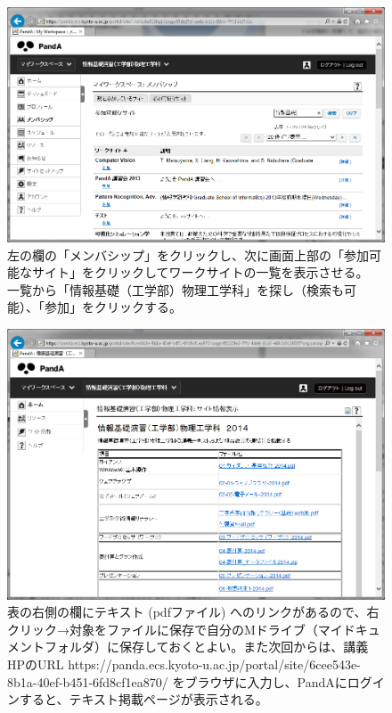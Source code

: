 \begin{figure}
\centering
\includegraphics[width=13cm]{TeX_files/figs1/PandA2.png}
\caption{
\label{fig:PandA2}
左の欄の「メンバシップ」をクリックし、次に画面上部の「参加可能なサイト」をクリックしてワークサイトの一覧を表示させる。
一覧から「情報基礎（工学部）物理工学科」を探し（検索も可能）、「参加」をクリックする。}
\end{figure}

\begin{figure}
\centering
\includegraphics[width=13cm]{TeX_files/figs1/PandA3.png}
\caption{
\label{fig:PandA3}
表の右側の欄にテキスト (pdfファイル) へのリンクがあるので、右クリック→対象をファイルに保存で自分のMドライブ（マイドキュメントフォルダ）に保存しておくとよい。また次回からは、講義HPのURL
https://panda.ecs.kyoto-u.ac.jp/portal/site/6cee543e-8b1a-40ef-b451-6fd8cf1ea870/
をブラウザに入力し、PandAにログインすると、テキスト掲載ページが表示される。
}\end{figure}

